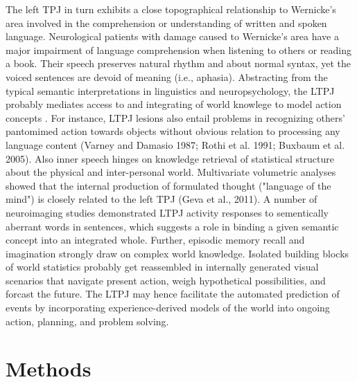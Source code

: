 \documentclass{article} %
\begin{document}
The left TPJ in turn exhibits a close topographical relationship to
Wernicke's area
involved in the comprehension or understanding of written and spoken language.
Neurological patients with damage caused to Wernicke's area
have a major impairment of language comprehension
when listening to others or reading a book.
Their speech
preserves natural rhythm and about normal syntax, yet the
voiced sentences are devoid of meaning (i.e., aphasia).
Abstracting from the typical semantic interpretations in linguistics
and neuropsychology,
the LTPJ probably mediates access to and integrating of world knowlege
to model action concepts
\citep{binder2011neurobiology, seghier2013angular}.
For instance, LTPJ lesions also entail problems in recognizing
others' pantomimed action towards objects
without obvious relation to processing any language content
(Varney and Damasio 1987; Rothi et al. 1991; Buxbaum et al. 2005).
%
Also inner speech hinges on knowledge retrieval of statistical structure
about the physical and inter-personal world.
Multivariate volumetric analyses showed that the internal production of
formulated thought ("language of the mind") is closely related to the left TPJ
(Geva et al., 2011).
A number of neuroimaging studies demonstrated LTPJ activity responses
to sementically aberrant words in sentences, which suggests a role
in binding a given semantic concept into an integrated whole.
Further,
episodic memory recall and imagination strongly draw on
complex world knowledge.
Isolated building blocks of world statistics probably get reassembled
in internally generated visual scenarios that
navigate present action, weigh hypothetical possibilities, and forcast the future.
%
The LTPJ may hence facilitate the automated prediction of events
by incorporating experience-derived models of the world
into ongoing action, planning, and problem solving.


\section{Methods}
\end{document}

